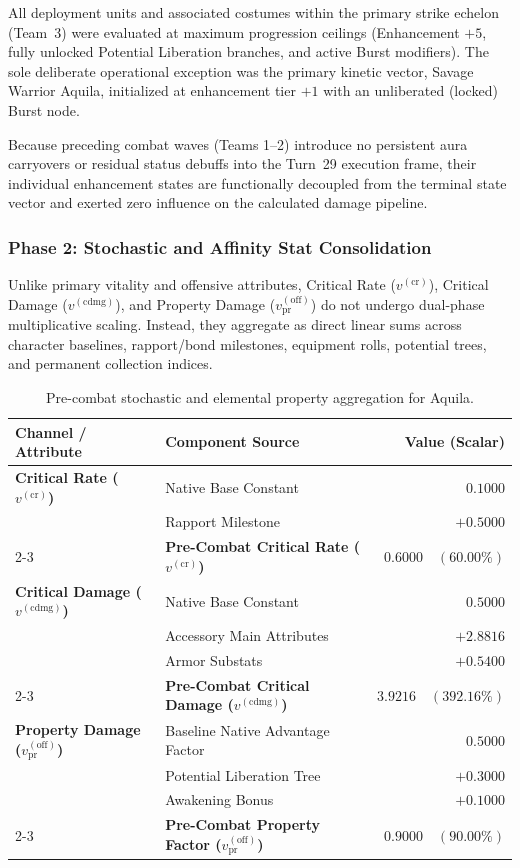 \documentclass[twocolumn,10pt]{article}
\begin{document}
All deployment units and associated costumes within the primary strike echelon (Team~3) were evaluated at maximum progression ceilings (Enhancement $+5$, fully unlocked Potential Liberation branches, and active Burst modifiers). The sole deliberate operational exception was the primary kinetic vector, Savage Warrior Aquila, initialized at enhancement tier $+1$ with an unliberated (locked) Burst node.

Because preceding combat waves (Teams 1--2) introduce no persistent aura carryovers or residual status debuffs into the Turn~29 execution frame, their individual enhancement states are functionally decoupled from the terminal state vector and exerted zero influence on the calculated damage pipeline.

\subsubsection{Phase 2: Stochastic and Affinity Stat Consolidation}
Unlike primary vitality and offensive attributes, Critical Rate ($v^{(\text{cr})}$), Critical Damage ($v^{(\text{cdmg})}$), and Property Damage ($v_{\text{pr}}^{(\text{off})}$) do not undergo dual-phase multiplicative scaling. Instead, they aggregate as direct linear sums across character baselines, rapport/bond milestones, equipment rolls, potential trees, and permanent collection indices.

\begin{table}[H]
\centering
\small
\begin{tabular}{llr}
\toprule
\textbf{Channel / Attribute} & \textbf{Component Source} & \textbf{Value (Scalar)} \\
\midrule
\textbf{Critical Rate ($v^{(\text{cr})}$)} 
  & Native Base Constant & $0.1000$ \\
  & Rapport Milestone & $+0.5000$ \\
\cmidrule{2-3}
  & \textbf{Pre-Combat Critical Rate ($v^{(\text{cr})}$)} & $\mathbf{0.6000 \quad (60.00\%)}$ \\
\midrule
\textbf{Critical Damage ($v^{(\text{cdmg})}$)} 
  & Native Base Constant & $0.5000$ \\
  & Accessory Main Attributes & $+2.8816$ \\
  & Armor Substats & $+0.5400$ \\
\cmidrule{2-3}
  & \textbf{Pre-Combat Critical Damage ($v^{(\text{cdmg})}$)} & $\mathbf{3.9216 \quad (392.16\%)}$ \\
\midrule
\textbf{Property Damage ($v_{\text{pr}}^{(\text{off})}$)} 
  & Baseline Native Advantage Factor & $0.5000$ \\
  & Potential Liberation Tree & $+0.3000$ \\
  & Awakening Bonus & $+0.1000$ \\
\cmidrule{2-3}
  & \textbf{Pre-Combat Property Factor ($v_{\text{pr}}^{(\text{off})}$)} & $\mathbf{0.9000 \quad (90.00\%)}$ \\
\bottomrule
\end{tabular}
\caption{Pre-combat stochastic and elemental property aggregation for Aquila.}
\label{tab:prefight_secondary_stats}
\end{table}
\end{document}
